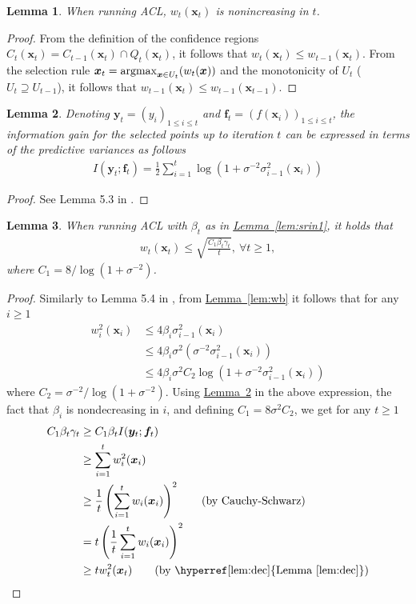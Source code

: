 \documentclass{article}
\def\*#1{\bm{#1}}
\newcommand{\lemmaref}[1]{\hyperref[#1]{\mbox{Lemma~\ref*{#1}}}}
\newcommand{\argmax}{\operatornamewithlimits{argmax}}
\newtheorem{lemma}{Lemma}
\begin{document}
\begin{lemma}
\label{lem:dec}
When running ACL, $w_t(\*x_t)$ is nonincreasing in $t$.
\end{lemma}
\begin{proof}
From the definition of the confidence regions
$C_t(\*x_t) = C_{t-1}(\*x_t) \cap Q_t(\*x_t)$, it follows that
$w_t(\*x_t) \leq w_{t-1}(\*x_t)$. From the selection rule
$\*x_t = \argmax_{\*x\in U_t}(w_t(\*x))$ and the monotonicity of
$U_t$ ($U_t \supseteq U_{t-1}$), it follows that
$w_{t-1}(\*x_t) \leq w_{t-1}(\*x_{t-1})$.
\end{proof}

\begin{lemma}
\label{lem:ig}
Denoting $\*y_t = (y_i)_{1\leq i\leq t}$ and
$\*f_t = (f(\*x_i))_{1\leq i\leq t}$,
the information gain for the selected points up to iteration $t$ can be
expressed in terms of the predictive variances as follows
\begin{align*}
I(\*y_t; \*f_t) = \frac{1}{2}\sum_{i=1}^t \log(1 + \sigma^{-2}\sigma_{i-1}^2(\*x_i))
\end{align*}
\end{lemma}
\begin{proof}
See Lemma 5.3 in \cite{srinivas2010}.
\end{proof}

\begin{lemma}
When running ACL with $\beta_t$ as in \lemmaref{lem:srin1}, it holds that
\begin{align*}
w_t(\*x_t) \leq \sqrt{\frac{C_1 \beta_t \gamma_t}{t}},\ \forall t \geq 1,
\end{align*}
where $C_1 = 8 / \log(1 + \sigma^{-2})$.
\end{lemma}
\begin{proof}
Similarly to Lemma 5.4 in \cite{srinivas2010},
from \lemmaref{lem:wb} it follows that for any $i \geq 1$
\begin{align*}
w_i^2(\*x_i) &\leq 4\beta_i\sigma_{i-1}^2(\*x_i)\\
&\leq 4\beta_i\sigma^2(\sigma^{-2}\sigma_{i-1}^2(\*x_i))\\
&\leq 4\beta_i\sigma^2 C_2\log(1 + \sigma^{-2}\sigma_{i-1}^2(\*x_i))
\end{align*}
where $C_2 = \sigma^{-2}/\log(1 + \sigma^{-2})$.
Using \lemmaref{lem:ig} in the above expression, the fact that $\beta_i$
is nondecreasing in $i$, and defining $C_1 = 8\sigma^2C_2$,
we get for any $t \geq 1$
\begin{align*}
C_1\beta_t\gamma_t &\geq C_1\beta_t I(\*y_t; \*f_t)\\
                   &\geq \sum_{i=1}^t w_i^2(\*x_i)\\
                   &\geq \frac{1}{t}\left(\sum_{i=1}^t w_i(\*x_i)\right)^2 \tag*{\textrm{(by Cauchy-Schwarz)}}\\
                   &= t \left(\frac{1}{t}\sum_{i=1}^t w_i(\*x_i)\right)^2\\
                   &\geq t w_t^2(\*x_t) \tag*{\textrm{(by \lemmaref{lem:dec})}}
\end{align*}
\end{proof}
\end{document}
